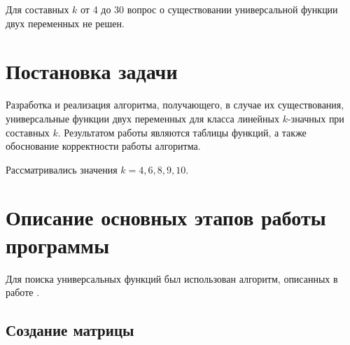 \documentclass[oneside,final,14pt]{extreport}
\begin{document}
Для составных \(k\) от 4 до 30 вопрос о существовании универсальной функции двух переменных не решен.

%




  \chapter{Постановка задачи}
  
Разработка и реализация алгоритма, получающего, в случае их существования, универсальные функции 
двух переменных для класса линейных \(k\)-значных при составных \(k\). Результатом работы являются таблицы 
функций, а также обоснование корректности работы алгоритма.
  
Рассматривались значения \(k = 4, 6, 8, 9, 10\).

\chapter{Описание основных этапов работы программы}

Для поиска универсальных функций был использован алгоритм, описанных в работе \cite{}.

\section{Создание матрицы}
\end{document}
